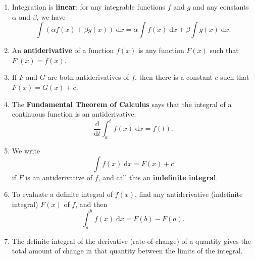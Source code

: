 \documentclass{article}
\newcommand{\deriv}[2]{\frac{\mathrm{d}#1}{\mathrm{d}#2}}
\newcommand{\diff}{\;\mathrm{d}}
\begin{document}
\vspace{5mm}

\begin{enumerate}
	\item Integration is \textbf{linear}: for any integrable functions $f$ and $g$ and any constants $\alpha$ and $\beta$, we have
		\[\int(\alpha f(x)+\beta g(x))\diff x = \alpha\int f(x)\diff x + \beta \int g(x)\diff x.\]
	\item An \textbf{antiderivative} of a function $f(x)$ is any function $F(x)$ such that $F'(x)=f(x)$.
	\item If $F$ and $G$ are both antiderivatives of $f$, then there is a constant $c$ such that $F(x)=G(x)+c$.
	\item The \textbf{Fundamental Theorem of Calculus} says that the integral of a continuous function is an antiderivative:
		\[\deriv{}{t} \int_a^t f(x)\diff x = f(t).\]
	\item We write
		\[\int f(x)\diff x = F(x)+c\]
		if $F$ is an antiderivative of $f$, and call this an \textbf{indefinite integral}.
	\item To evaluate a definite integral of $f(x)$,	find any antiderivative (indefinite integral) $F(x)$ of $f$, and then
		\[\int_a^b f(x)\diff x = F(b)-F(a).\]
	\item The definite integral of the derivative (rate-of-change) of a quantity gives the total amount of change in that quantity between the limits of the integral.
\end{enumerate}
\end{document}
